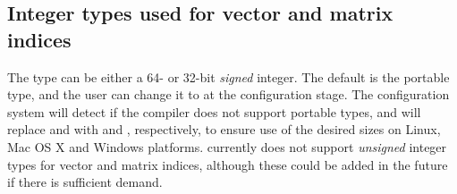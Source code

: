\subsection{Integer types used for vector and matrix indices}

The type  can be either a 64- or 32-bit \emph{signed} integer.
The default is the portable  type, and the user can change it
to  at the configuration stage. The configuration system
will detect if the compiler does not support portable types, and will
replace  and  with  and ,
respectively, to ensure use of the desired sizes on Linux, Mac OS X and Windows
platforms. {\sundials} currently does not support \emph{unsigned} integer types 
for vector and matrix indices, although these could be added in the future if there 
is sufficient demand.
